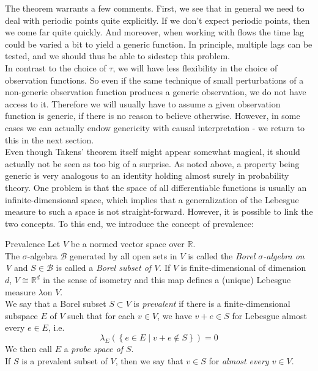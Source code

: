 \documentclass[11pt, a4paper]{memoir}
\theoremstyle{break}
\theoremstyle{break}
\theoremstyle{nonumberplain}
\newcommand{\mR}{\mathbb{R}}
\begin{document}
The theorem warrants a few comments. First, we see that in general we need to deal with periodic points quite explicitly. If we don't expect periodic points, then we come far quite quickly. And moreover, when working with flows the time lag could be varied a bit to yield a generic function. In principle, multiple lags can be tested, and we should thus be able to sidestep this problem. \\[5pt]
In contrast to the choice of $\tau$, we will have less flexibility in the choice of observation functions. So even if the same technique of small perturbations of a non-generic observation function produces a generic observation, we do not have access to it. Therefore we will usually have to assume a given observation function is generic, if there is no reason to believe otherwise. However, in some cases we can actually endow genericity with causal interpretation - we return to this in the next section.\\[5pt]
Even though Takens' theorem itself might appear somewhat magical, it should actually not be seen as too big of a surprise. As noted above, a property being generic is very analogous to an identity holding almost surely in probability theory. One problem is that the space of all differentiable functions is usually an infinite-dimensional space, which implies that a generalization of the Lebesgue measure to such a space is not straight-forward. However, it is possible to link the two concepts. To this end, we introduce the concept of prevalence:
\begin{mydefinition}{Prevalence}
Let $V$ be a normed vector space over $\mR$.\\[5pt]
The $\sigma$-algebra $\mathcal{B}$ generated by all open sets in $V$ is called the \emph{Borel $\sigma$-algebra on V} and $S\in \mathcal{B}$ is called a \emph{Borel subset of $V$}. If $V$ is finite-dimensional of dimension $d$, $V\cong \mR^d$ in the sense of isometry and this map defines a (unique) Lebesgue measure $\lambda $on $V$.\\[5pt]
We say that a Borel subset $S\subset V$ is \emph{prevalent} if there is a finite-dimensional subspace $E$ of $V$ such that for each $v\in V$, we have $v+e\in S$ for Lebesgue almost every $e\in E$, i.e.
$$\lambda_E\left(\left\{e\in E\mid v+e\notin S\right\}\right)=0$$
We then call $E$ a \emph{probe space of $S$}.\\[5pt]
If $S$ is a prevalent subset of $V$, then we say that $v\in S$ for \emph{almost every $v\in V$}.
\end{mydefinition}
\end{document}
